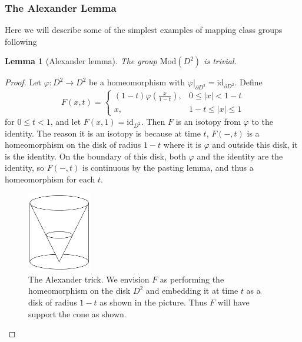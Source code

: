 \documentclass[reqno]{amsart}
\newtheorem{lemma}[theorem]{Lemma}
\theoremstyle{definition}
\theoremstyle{remark}
\newcommand{\id}{{\mathrm{id}}}
\newcommand{\Mod}{{\mathrm{Mod}}}
\begin{document}
\subsubsection*{The Alexander Lemma}

Here we will describe some of the simplest examples of
mapping class groups following \cite[Chapter 2.1]{Farb-Margalit}

\begin{lemma}[Alexander lemma]
   The group $\Mod\left( D^2 \right) $ is trivial. 
\end{lemma}

\begin{proof}
    Let $\varphi  \colon D^2 \to D^2$ be a homeomorphism
    with $\varphi |_{\partial D^2} = \id_{\partial D^2}$.
    Define 
    \[
    F(x,t) = 
    \begin{cases}
        (1-t) \varphi \left( \frac{x}{1-t} \right) ,& 
        0\le \left| x \right| <1-t\\
        x,& 1-t \le \left| x \right| \le 1
    \end{cases}
    \] 
    for $0\le t < 1$, and let 
    $F(x,1) = \id_{D^2}$. Then $F$ is an isotopy from
    $\varphi $ to the identity. The reason it is an
    isotopy is because at time $t$, $F(-,t)$ is
    a homeomorphism on the disk of
    radius  $1-t$ where it is $\varphi $ and
    outside this disk, it is the identity. On the boundary
    of this disk, both $\varphi $ and the identity are
    the identity, so $F(-,t)$ is continuous by the pasting lemma,
    and thus a homeomorphism for each $t$.

    \begin{figure}[H]
        \centering
        \includegraphics[width=0.25\textwidth]{alexander-trick.png}
        \caption{The Alexander trick. We envision 
        $F$ as performing the homeomorphism on the disk $D^2$ 
    and embedding it at time $t$ as a disk of radius
$1-t$ as shown in the picture. Thus $F$ will have support
the cone as shown.}
        \label{fig:alexander-trick-png}
    \end{figure}
\end{proof}
\end{document}
